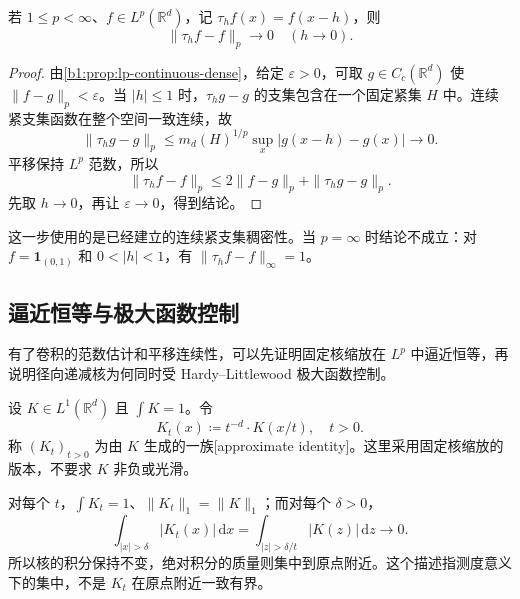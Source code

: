 \begin{lemma}\label{b1:lem:lp-translation-continuity}
若 \(1\leq p<\infty\)、\(f\in L^p(\mathbb R^d)\)，记 \(\tau_hf(x)=f(x-h)\)，则
\[
 \|\tau_hf-f\|_p\longrightarrow0\quad(h\to0).
\]
\end{lemma}
\begin{proof}
由\cref{b1:prop:lp-continuous-dense}，给定 \(\varepsilon>0\)，可取 \(g\in C_c(\mathbb R^d)\) 使 \(\|f-g\|_p<\varepsilon\)。当 \(|h|\leq1\) 时，\(\tau_hg-g\) 的支集包含在一个固定紧集 \(H\) 中。连续紧支集函数在整个空间一致连续，故
\[
 \|\tau_hg-g\|_p
 \leq m_d(H)^{1/p}\sup_x|g(x-h)-g(x)|\longrightarrow0.
\]
平移保持 \(L^p\) 范数，所以
\[
 \|\tau_hf-f\|_p
 \leq2\|f-g\|_p+\|\tau_hg-g\|_p.
\]
先取 \(h\to0\)，再让 \(\varepsilon\to0\)，得到结论。
\end{proof}

这一步使用的是已经建立的连续紧支集稠密性。当 \(p=\infty\) 时结论不成立：对 \(f=\mathbf1_{(0,1)}\) 和 \(0<|h|<1\)，有 \(\|\tau_hf-f\|_\infty=1\)。

\subsection{逼近恒等与极大函数控制}
\label{b1:subsec:130403}

有了卷积的范数估计和平移连续性，可以先证明固定核缩放在 \(L^p\) 中逼近恒等，再说明径向递减核为何同时受 Hardy--Littlewood 极大函数控制。

\begin{definition}\label{b1:def:approximate-identity}
设 \(K\in L^1(\mathbb R^d)\) 且 \(\int K=1\)。令
\[
 K_t(x)\coloneqq t^{-d}\cdot K(x/t),\quad t>0.
\]
称 \((K_t)_{t>0}\) 为由 \(K\) 生成的一族[approximate identity]。这里采用固定核缩放的版本，不要求 \(K\) 非负或光滑。
\end{definition}

对每个 \(t\)，\(\int K_t=1\)、\(\|K_t\|_1=\|K\|_1\)；而对每个 \(\delta>0\)，
\[
 \int_{|x|>\delta}|K_t(x)|\,\mathrm dx
 =\int_{|z|>\delta/t}|K(z)|\,\mathrm dz\longrightarrow0.
\]
所以核的积分保持不变，绝对积分的质量则集中到原点附近。这个描述指测度意义下的集中，不是 \(K_t\) 在原点附近一致有界。

